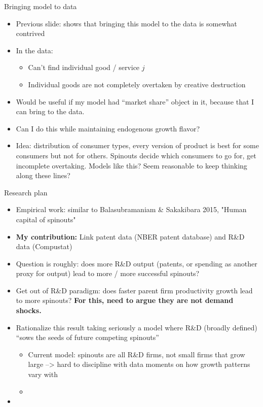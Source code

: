 \documentclass[english,usenames,dvipsnames]{beamer}
\begin{document}
\begin{frame}{Bringing model to data}
\begin{itemize}
	\item Previous slide: shows that bringing this model to the data is somewhat contrived
	\item In the data:
	\begin{itemize}
		\item Can't find individual good / service $j$
		\item Individual goods are not completely overtaken by creative destruction
	\end{itemize}
	\item Would be useful if my model had ``market share'' object in it, because that I can bring to the data. 
	\item Can I do this while maintaining endogenous growth flavor?
	\item Idea: distribution of consumer types, every version of product is best for some consumers but not for others. Spinouts decide which consumers to go for, get incomplete overtaking. Models like this? Seem reasonable to keep thinking along these lines?
\end{itemize}
\end{frame}

\begin{frame}{Research plan}
\begin{itemize}
	\small
	\item Empirical work: similar to Balasubramaniam \& Sakakibara 2015, "Human capital of spinouts" 
	\item \textbf{My contribution: } Link patent data (NBER patent database) and R\&D data (Compustat)
	\item Question is roughly: does more R\&D output (patents, or spending as another proxy for output) lead to more / more successful spinouts?
	\item Get out of R\&D paradigm: does faster parent firm productivity growth lead to more spinouts? \textbf{For this, need to argue they are not demand shocks.}
	\item Rationalize this result taking seriously a model where R\&D (broadly defined) ``sows the seeds of future competing spinouts'' 
	\begin{itemize}
		\item Current model: spinouts are all R\&D firms, not small firms that grow large --> hard to discipline with data moments on how growth patterns vary with 
		\item  
	\end{itemize}
	\item 
\end{itemize}
\end{frame}
\end{document}

